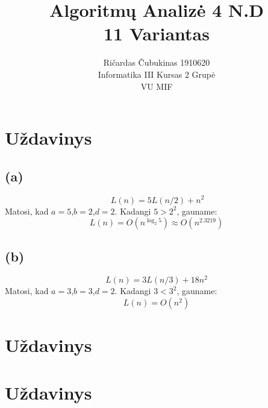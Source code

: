 \documentclass[a4paper,lithuanian]{article}
\title{Algoritmų Analizė 4 N.D\\11 Variantas}
\author{
  Ričardas Čubukinas 1910620\\
  Informatika III Kursas 2 Grupė\\
  VU MIF
}
\begin{document}
\maketitle

\section{Uždavinys}
\subsection*{(a)}
\[~L(n)=5L(n/2)+n^2\]
Matosi, kad $a=5$,$b=2$,$d=2$. Kadangi $5 > 2^2$, gauname:
\[L(n)=O(n^{\log_2{5}})\approx{}O(n^{2.3219})\]
\subsection*{(b)}
\[L(n)=3L(n/3)+18n^2\]
Matosi, kad $a=3$,$b=3$,$d=2$. Kadangi $3 < 3^2$, gauname:
\[L(n)=O(n^2)\]
\section{Uždavinys}

\section{Uždavinys}
\end{document}
